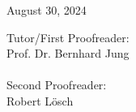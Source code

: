 \begin{titlepage}
\begin{center}
  	\vspace*{1cm}
	{\large \textsf{August 30, 2024}}\\  %

 
\end{center}	

\vfill

%
%
%
%
	\noindent
    \hspace*{1cm}\textsf{Tutor/First Proofreader:}\\
    \hspace*{1cm}\textsf{Prof. Dr. Bernhard Jung}\\
    \\
	\noindent
    \hspace*{1cm}\textsf{Second Proofreader:}\\
    \hspace*{1cm}\textsf{Robert L{\"o}sch}\\
    \\
	\vspace*{-3cm}
\end{titlepage}
